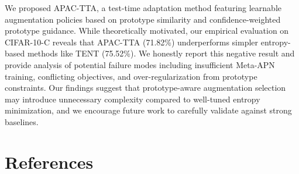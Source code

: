 \documentclass{article}
\begin{document}
We proposed APAC-TTA, a test-time adaptation method featuring learnable augmentation policies based on prototype similarity and confidence-weighted prototype guidance. While theoretically motivated, our empirical evaluation on CIFAR-10-C reveals that APAC-TTA (71.82\%) underperforms simpler entropy-based methods like TENT (75.52\%). We honestly report this negative result and provide analysis of potential failure modes including insufficient Meta-APN training, conflicting objectives, and over-regularization from prototype constraints. Our findings suggest that prototype-aware augmentation selection may introduce unnecessary complexity compared to well-tuned entropy minimization, and we encourage future work to carefully validate against strong baselines.

\section*{References}
\end{document}
